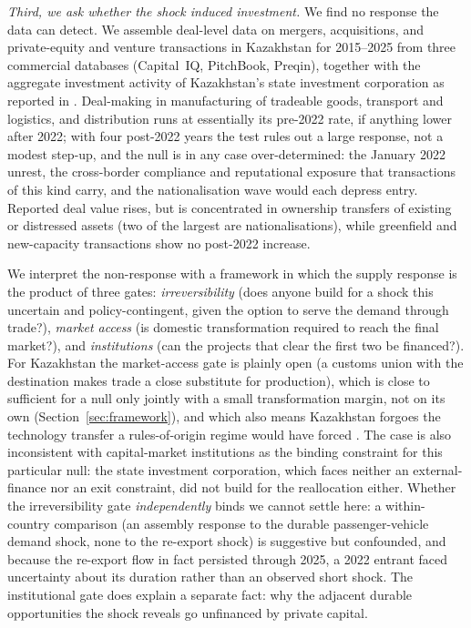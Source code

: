 \documentclass[12pt]{article}
\begin{document}
\emph{Third, we ask whether the shock induced investment.} We find no response the data can
detect. We assemble deal-level data on mergers, acquisitions, and private-equity and venture
transactions in Kazakhstan for 2015--2025 from three commercial databases (Capital~IQ,
PitchBook, Preqin), together with the aggregate investment activity of Kazakhstan's state
investment corporation as reported in \citet{qicaifcifc2026pe}. Deal-making in manufacturing of tradeable goods,
transport and logistics, and distribution runs at essentially its pre-2022 rate, if anything
lower after 2022; with four post-2022 years the test rules out a large response, not a modest
step-up, and the null is in any case over-determined: the January 2022 unrest, the
cross-border compliance and reputational exposure that transactions of this kind carry, and
the nationalisation wave would each depress entry. Reported deal value
rises, but is concentrated in ownership transfers of existing or
distressed assets (two of the largest are nationalisations), while greenfield and
new-capacity transactions show no post-2022 increase.

We interpret the non-response with a framework in which the supply response is the product of
three gates: \emph{irreversibility} (does anyone build for a shock this uncertain and
policy-contingent, given the option to serve the demand through trade?), \emph{market access}
(is domestic transformation required to reach the final market?), and \emph{institutions} (can
the projects that clear the first two be financed?). For Kazakhstan the market-access gate is
plainly open (a customs union with the destination makes trade a close substitute for
production), which is close to sufficient for a null only jointly with a small transformation
margin, not on its own (Section~\ref{sec:framework}), and which also means Kazakhstan forgoes
the technology transfer a rules-of-origin regime would have forced \citep{desouza2024diffusion}. The case
is also inconsistent with capital-market institutions as the binding constraint for this particular null:
the state investment corporation, which faces neither an external-finance nor an exit
constraint, did not build for the reallocation either. Whether the irreversibility gate
\emph{independently} binds we cannot settle here: a within-country comparison (an assembly
response to the durable passenger-vehicle demand shock, none to the re-export shock) is
suggestive but confounded, and because the re-export flow in fact persisted through 2025, a
2022 entrant faced uncertainty about its duration rather than an observed short shock. The
institutional gate does explain a separate fact: why the adjacent durable opportunities the
shock reveals go unfinanced by private capital.
\end{document}
